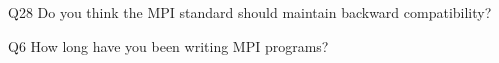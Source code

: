 \begin{description}%
\item{Q28} Do you think the MPI standard should maintain backward compatibility?%
\item{Q6} How long have you been writing MPI programs?%
\end{description}%
